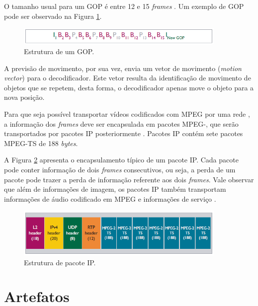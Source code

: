 O tamanho usual para um GOP é entre 12 e 15 \emph{frames} \cite{ciscoieee, mpeg2ref}. Um exemplo de GOP pode ser observado na Figura \ref{fig:gop}.

\begin{figure}[!htb]
	\centering
	\includegraphics[width=0.9\textwidth]{./imgs/gop.png}
	\caption{Estrutura de um GOP.}
	\label{fig:gop}
\end{figure}

A previsão de movimento, por sua vez, envia um vetor de movimento (\emph{motion vector}) para o decodificador. Este vetor resulta da identificação de movimento de objetos que se repetem, desta forma, o decodificador apenas move o objeto para a nova posição.

Para que seja possível transportar vídeos codificados com MPEG por uma rede , a informação dos \emph{frames} deve ser encapsulada em pacotes MPEG-, que serão transportados por pacotes IP posteriormente \cite{ciscoieee}. Pacotes IP contém sete pacotes MPEG-TS de 188 \emph{bytes}. 

A Figura \ref{fig:ts} apresenta o encapsulamento típico de um pacote IP. Cada pacote pode conter informação de dois \emph{frames} consecutivos, ou seja, a perda de um pacote pode trazer a perda de informação referente aos dois \emph{frames}. Vale observar que além de informações de imagem, os pacotes IP também transportam informações de áudio codificado em MPEG e informações de serviço \cite{ciscoieee}.

\begin{figure}[!htb]
	\centering
	\includegraphics[width=0.9\textwidth]{./imgs/ts.png}
	\caption{Estrutura de pacote IP.}
	\label{fig:ts}
\end{figure}

\section{Artefatos}

